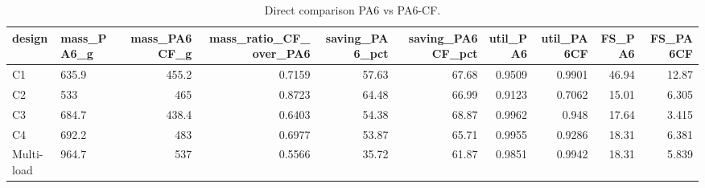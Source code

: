 \begin{table}[htbp]
\centering
\caption{Direct comparison PA6 vs PA6-CF.}
\label{tab:T10_05_PA6_vs_PA6CF}
\begin{tabular}{llrrrrrrrr}
\toprule
design & mass\_PA6\_g & mass\_PA6CF\_g & mass\_ratio\_CF\_over\_PA6 & saving\_PA6\_pct & saving\_PA6CF\_pct & util\_PA6 & util\_PA6CF & FS\_PA6 & FS\_PA6CF \\
\midrule
C1 & 635.9 & 455.2 & 0.7159 & 57.63 & 67.68 & 0.9509 & 0.9901 & 46.94 & 12.87 \\
C2 & 533 & 465 & 0.8723 & 64.48 & 66.99 & 0.9123 & 0.7062 & 15.01 & 6.305 \\
C3 & 684.7 & 438.4 & 0.6403 & 54.38 & 68.87 & 0.9962 & 0.948 & 17.64 & 3.415 \\
C4 & 692.2 & 483 & 0.6977 & 53.87 & 65.71 & 0.9955 & 0.9286 & 18.31 & 6.381 \\
Multi-load & 964.7 & 537 & 0.5566 & 35.72 & 61.87 & 0.9851 & 0.9942 & 18.31 & 5.839 \\
\bottomrule
\end{tabular}
\end{table}
